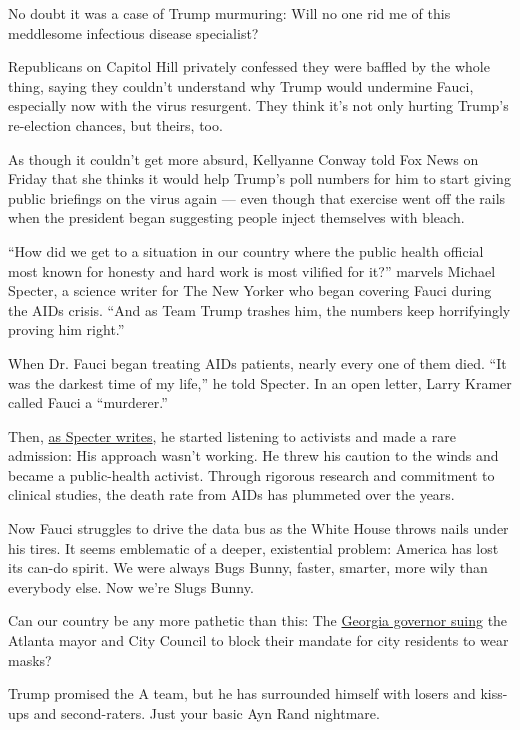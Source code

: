 No doubt it was a case of Trump murmuring: Will no one rid me of this
meddlesome infectious disease specialist?

Republicans on Capitol Hill privately confessed they were baffled by the
whole thing, saying they couldn't understand why Trump would undermine
Fauci, especially now with the virus resurgent. They think it's not only
hurting Trump's re-election chances, but theirs, too.

As though it couldn't get more absurd, Kellyanne Conway told Fox News on
Friday that she thinks it would help Trump's poll numbers for him to
start giving public briefings on the virus again --- even though that
exercise went off the rails when the president began suggesting people
inject themselves with bleach.

``How did we get to a situation in our country where the public health
official most known for honesty and hard work is most vilified for it?''
marvels Michael Specter, a science writer for The New Yorker who began
covering Fauci during the AIDs crisis. ``And as Team Trump trashes him,
the numbers keep horrifyingly proving him right.''

When Dr. Fauci began treating AIDs patients, nearly every one of them
died. ``It was the darkest time of my life,'' he told Specter. In an
open letter, Larry Kramer called Fauci a ``murderer.''

Then,
\href{https://www.newyorker.com/magazine/2020/04/20/how-anthony-fauci-became-americas-doctor}{as
Specter writes}, he started listening to activists and made a rare
admission: His approach wasn't working. He threw his caution to the
winds and became a public-health activist. Through rigorous research and
commitment to clinical studies, the death rate from AIDs has plummeted
over the years.

Now Fauci struggles to drive the data bus as the White House throws
nails under his tires. It seems emblematic of a deeper, existential
problem: America has lost its can-do spirit. We were always Bugs Bunny,
faster, smarter, more wily than everybody else. Now we're Slugs Bunny.

Can our country be any more pathetic than this: The
\href{https://www.nytimes.com/aponline/2020/07/16/us/ap-us-virus-outbreak-georgia.html}{Georgia
governor suing} the Atlanta mayor and City Council to block their
mandate for city residents to wear masks?

Trump promised the A team, but he has surrounded himself with losers and
kiss-ups and second-raters. Just your basic Ayn Rand nightmare.

